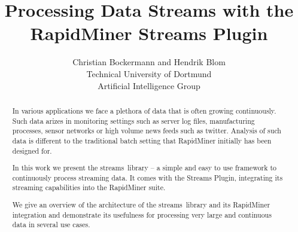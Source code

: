 \documentclass[10pt, twoside]{article}
\date{}           %
\title{\LARGE \bfseries Processing Data Streams with the RapidMiner Streams Plugin}
\author{Christian Bockermann and Hendrik Blom\\ Technical University of Dortmund \\ Artificial Intelligence Group \\ \ttfamily{\{christian.bockermann,hendrik.blom\}@udo.edu}}
\newcommand{\streams}{\textsf{streams}\ }
\newcommand{\plugin}{\textsf{Streams Plugin}}
\begin{document}
\maketitle\thispagestyle{empty}

\begin{abstract}
  In various applications we face a plethora of data that is often
  growing continuously. Such data arizes in monitoring settings such
  as server log files, manufacturing processes, sensor networks or
  high volume news feeds such as twitter. Analysis of such data is
  different to the traditional batch setting that RapidMiner initially
  has been designed for.

  In this work we present the \streams library -- a simple and easy to
  use framework to continuously process streaming data. It comes with
  the \plugin, integrating its streaming capabilities into the
  RapidMiner suite.
  
  We give an overview of the architecture of the \streams library and
  its RapidMiner integration and demonstrate its usefulness for
  processing very large and continuous data in several use cases.
\end{abstract}












%







\end{document}
